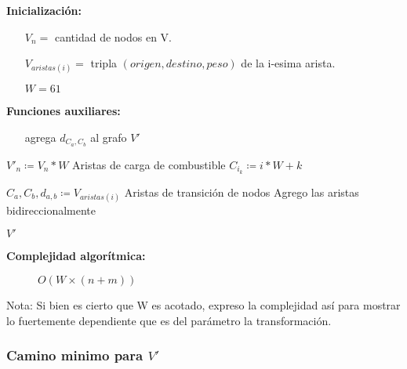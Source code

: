 \documentclass[12pt]{article}
\def\is{\coloneqq}
\begin{document}
\begin{algorithm}[H]
	\caption{$f(V)$}
	\begin{algorithmic}[1]
		\item[\textbf{Inicialización:}]
		\item[] \begin{itemize}
			\item[] $V_n = $ cantidad de nodos en V.
			\item[] $V_{aristas(i)} = $ tripla $(origen, destino, peso)$ de la i-esima arista.
			\item[] $W = 61$
		\end{itemize}
		\item[\textbf{Funciones auxiliares:}]
		\item[] \begin{itemize}
			\item[]  agrega $d_{C_a,C_b}$ al grafo $V'$
		\end{itemize}
		\Statex
		\state $V'_n \is V_n * W$
		\Comment Aristas de carga de combustible
		\State $C_{i_k} \is i * W + k$
		\State {}
		\EndFor
		\EndFor
		\State
		
		\State $C_a,C_b,d_{a,b} \is V_{aristas(i)}$
		\Comment Aristas de transición de nodos
		\Comment Agrego las aristas bidireccionalmente
		\State {}
		\State {}
		\EndIf
		\EndFor
		\EndFor
		
		\State \Return $V'$
		\EndFunction
	\end{algorithmic}
	\begin{description}
		\item[\textbf{Complejidad algorítmica:}] $O(W \times (n + m))$
	\end{description}
\end{algorithm}

Nota: Si bien es cierto que W es acotado, expreso la complejidad así para mostrar lo fuertemente dependiente que es del parámetro la transformación.

\subsubsection{Camino minimo para $V'$}
\end{document}

